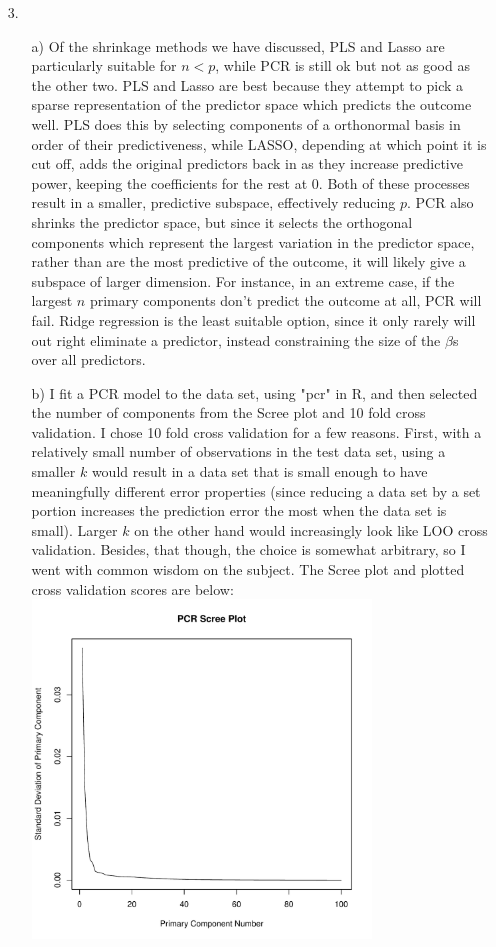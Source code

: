 \documentclass[11pt]{article}
\theoremstyle{definition}
\begin{document}
\begin{itemize}
\begin{itemize}
        \end{itemize}
    \item[3.]
        \begin{itemize}
            \item[a)]
                Of the shrinkage methods we have discussed, PLS and Lasso are particularly suitable for $n<p$, while PCR is still ok but not as good as the other two. PLS and Lasso are best because they attempt to pick a sparse representation of the predictor space which predicts the outcome well. PLS does this by selecting components of a orthonormal basis in order of their predictiveness, while LASSO, depending at which point it is cut off, adds the original predictors back in as they increase predictive power, keeping the coefficients for the rest at $0$. Both of these processes result in a smaller, predictive subspace, effectively reducing $p$. PCR also shrinks the predictor space, but since it selects the orthogonal components which represent the largest variation in the predictor space, rather than are the most predictive of the outcome, it will likely give a subspace of larger dimension. For instance, in an extreme case, if the largest $n$ primary components don't predict the outcome at all, PCR will fail. Ridge regression is the least suitable option, since it only rarely will out right eliminate a predictor, instead constraining the size of the $\beta$s over all predictors.
            \item[b)]
                I fit a PCR model to the data set, using "pcr" in R, and then selected the number of components from the Scree plot and 10 fold cross validation. I chose 10 fold cross validation for a few reasons. First, with a relatively small number of observations in the test data set, using a smaller $k$ would result in a data set that is small enough to have meaningfully different error properties (since reducing a data set by a set portion increases the prediction error the most when the data set is small). Larger $k$ on the other hand would increasingly look like LOO cross validation. Besides, that though, the choice is somewhat arbitrary, so I went with common wisdom on the subject. The Scree plot and plotted cross validation scores are below: \\
                \includegraphics[width=9cm]{final/3b_pcr_scree} 

\end{itemize}
\end{itemize}
\end{document}
